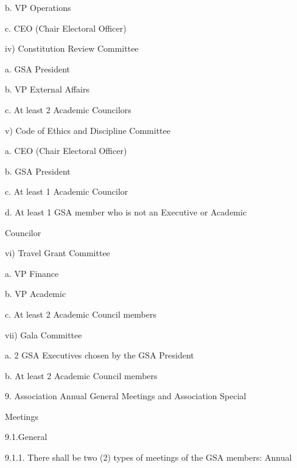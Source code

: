 \documentclass{article}
\begin{document}
b.  VP Operations  



c.  CEO (Chair Electoral Officer)  



iv)     Constitution Review Committee  



a.  GSA President  



b.  VP External Affairs  



c.  At least 2 Academic Councilors  



v)      Code of Ethics and Discipline Committee  



a.  CEO (Chair Electoral Officer)  



b.  GSA President  



c.  At least 1 Academic Councilor  



d.  At  least  1  GSA  member  who  is  not  an  Executive  or  Academic  

    Councilor  



vi)     Travel Grant Committee  



a.  VP Finance  



b.  VP Academic  



c.  At least 2 Academic Council members  



vii)    Gala Committee  



a.  2 GSA Executives chosen by the GSA President  



b.  At least 2 Academic Council members  



9.  Association   Annual   General   Meetings   and      Association   Special  

    Meetings  



9.1.General  



9.1.1. There shall be two (2) types of meetings of the GSA members: Annual  
\end{document}
